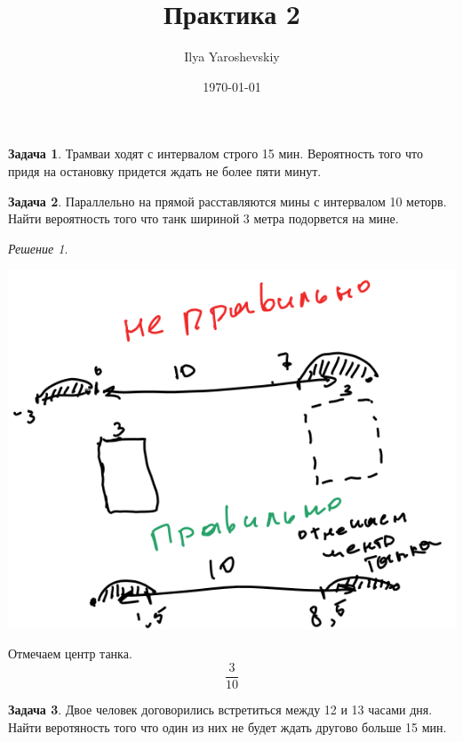\documentclass[english]{article}
\author{Ilya Yaroshevskiy}
\date{\today}
\title{Практика 2}
\theoremstyle{plain}
\theoremstyle{remark}
\newtheorem*{solution}{Решение}
\theoremstyle{definition}
\newtheorem{task}{Задача}
\begin{document}
\maketitle
\tableofcontents

\begin{task}
Трамваи ходят с интервалом строго 15 мин.
Вероятность того что придя на остановку придется ждать не более пяти минут.
\end{task}

\begin{task}
Параллельно на прямой расставляются мины с интервалом 10 меторв. Найти
вероятность того что танк шириной 3 метра подорвется на мине.
\end{task}
\begin{solution}
\-
\begin{center}
\includegraphics[scale=0.5]{2_1.png}
\end{center}
Отмечаем центр танка.
\[ \frac{3}{10} \]
\end{solution}
\begin{task}
Двое человек договорились встретиться между 12 и 13 часами дня. Найти
веротяность того что один из них не будет ждать другово больше 15 мин.
\end{task}
\end{document}

